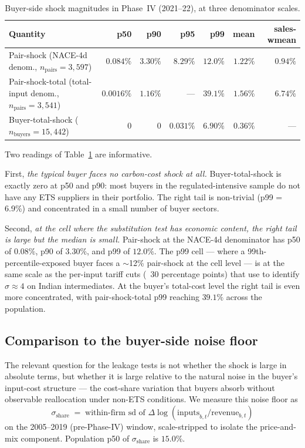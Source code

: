 \begin{table}[H]
    \centering
    \caption{Buyer-side shock magnitudes in Phase~IV (2021--22), at three denominator scales.}
    \label{tab:buyer_shock_phase4}
    \footnotesize
    \begin{tabular}{lrrrrrr}
        \toprule
        Quantity & p50 & p90 & p95 & p99 & mean & sales-wmean \\
        \midrule
        Pair-shock (NACE-4d denom., $n_{\text{pairs}} = 3{,}597$)   & $0.084\%$ & $3.30\%$ & $8.29\%$  & $12.0\%$ & $1.22\%$ & $0.94\%$ \\
        Pair-shock-total (total-input denom., $n_{\text{pairs}} = 3{,}541$)   & $0.0016\%$ & $1.16\%$ & --- & $\mathbf{39.1\%}$  & $1.56\%$ & $6.74\%$ \\
        Buyer-total-shock ($n_{\text{buyers}} = 15{,}442$)         & $0$       & $0$      & $0.031\%$ & $6.90\%$ & $0.36\%$ & --- \\
        \bottomrule
    \end{tabular}
\end{table}

Two readings of Table~\ref{tab:buyer_shock_phase4} are informative.

First, \emph{the typical buyer faces no carbon-cost shock at all.} Buyer-total-shock is exactly zero at p50 and p90: most buyers in the regulated-intensive sample do not have any ETS suppliers in their portfolio. The right tail is non-trivial (p99 = 6.9\%) and concentrated in a small number of buyer sectors.

Second, \emph{at the cell where the substitution test has economic content, the right tail is large but the median is small.} Pair-shock at the NACE-4d denominator has p50 of $0.08\%$, p90 of $3.30\%$, and p99 of $12.0\%$. The p99 cell --- where a 99th-percentile-exposed buyer faces a $\sim$12\% pair-shock at the cell level --- is at the same scale as the per-input tariff cuts (~30 percentage points) that \citet{peter2023} use to identify $\sigma \approx 4$ on Indian intermediates. At the buyer's total-cost level the right tail is even more concentrated, with pair-shock-total p99 reaching $39.1\%$ across the population.

\subsection{Comparison to the buyer-side noise floor}\label{sec:shock_signal_to_noise}

The relevant question for the leakage tests is not whether the shock is large in absolute terms, but whether it is large relative to the natural noise in the buyer's input-cost structure --- the cost-share variation that buyers absorb without observable reallocation under non-ETS conditions. We measure this noise floor as
\[
    \sigma_{\text{share}} \;=\; \text{within-firm sd of } \Delta \log(\text{inputs}_{b,t}/\text{revenue}_{b,t})
\]
on the 2005--2019 (pre-Phase-IV) window, scale-stripped to isolate the price-and-mix component. Population p50 of $\sigma_{\text{share}}$ is $15.0\%$.

